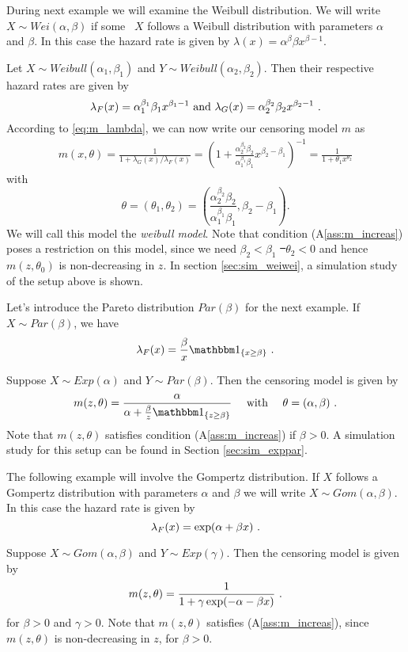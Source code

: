 %
During next example we will examine the Weibull distribution. We will write $X\sim Wei(\alpha, \beta)$ if some \rv\ $X$ follows a Weibull distribution with parameters $\alpha$ and $\beta$. In this case the hazard rate is given by $\lambda(x) = \alpha^{\beta}\beta x^{\beta-1}$.
\begin{example}
	Let $X \sim Weibull(\alpha_1, \beta_1)$ and $Y \sim Weibull(\alpha_2, \beta_2)$. Then their respective hazard rates are given by 
	$$\lambda_F(x) = \alpha_1^{\beta_1}\beta_1 x^{\beta_1-1} \textrm{ and } \lambda_G(x) = \alpha_2^{\beta_2}\beta_2 x^{\beta_2 -1}\textrm{ .}$$
	According to \eqref{eq:m_lambda}, we can now write our censoring model $m$ as 
	\begin{align*}
		m(x,\theta) = \frac{1}{1+\lambda_G(x)/\lambda_F(x)} =\left(1+\frac{\alpha_2^{\beta_2}\beta_2 }{\alpha_1^{\beta_1}\beta_1} x^{\beta_2-\beta_1}\right)^{-1} = \frac{1}{1+\theta_1 x^{\theta_2}}
	\end{align*}
	with
	$$\theta=(\theta_1,\theta_2)=\left(\frac{\alpha_2^{\beta_2}\beta_2 }{\alpha_1^{\beta_1}\beta_1},\beta_2-\beta_1\right)\textrm{.}$$
	We will call this model the \textit{weibull model}. Note that condition (A\ref{ass:m_increas}) poses a restriction on this model, since we need $\beta_2 < \beta_1$ \st\ $\theta_2 < 0$ and hence $m(z,\theta_0)$ is non-decreasing in $z$. In section \ref{sec:sim_weiwei}, a simulation study of the setup above is shown.
\end{example}
%
Let's introduce the Pareto distribution $Par(\beta)$ for the next example. If  $X\sim Par(\beta)$, we have
$$\lambda_F(x) = \frac{\beta}{x} \I{x\geq \beta}\mdot$$
\begin{example}
	Suppose $X\sim Exp(\alpha)$ and $Y\sim Par(\beta)$. Then the censoring model is given by
	$$m(z, \theta) =\frac{\alpha}{\alpha + \frac{\beta}{z} \I{z \geq \beta}} \quad\textrm{ with }\quad \theta = (\alpha, \beta)\mdot$$
	Note that $m(z,\theta)$ satisfies condition (A\ref{ass:m_increas}) if $\beta>0$. A simulation study for this setup can be found in Section \ref{sec:sim_exppar}.
\end{example}
%
The following example will involve the Gompertz distribution. If $X$ follows a Gompertz distribution with parameters $\alpha$ and $\beta$ we will write $X\sim Gom(\alpha,\beta)$. In this case the hazard rate is given by
$$\lambda_F(x) = \exp(\alpha + \beta x)\textrm{ .}$$
\begin{example}
	Suppose $X\sim Gom(\alpha, \beta)$ and $Y\sim Exp(\gamma)$. Then the censoring model is given by
	$$m(z, \theta) =\frac{1}{1 + \gamma\exp(-\alpha - \beta x)}\textrm{ .}$$
	for $\beta > 0$ and $\gamma > 0$. Note that $m(z,\theta)$ satisfies (A\ref{ass:m_increas}), since $m(z,\theta)$ is non-decreasing in $z$, for $\beta>0$.  
\end{example}

